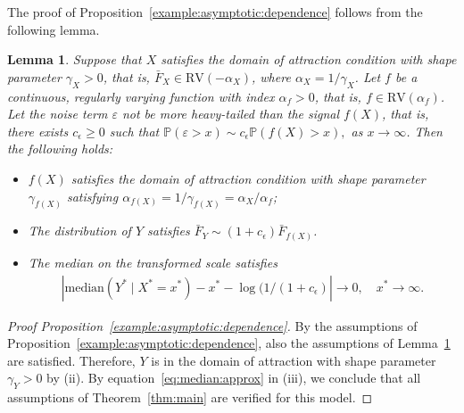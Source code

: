 \documentclass{statsoc}
\newtheorem{lemma}{Lemma}
\theoremstyle{break}
\renewcommand{\P}{\mathbb P}
\def\M{\text{median}}
\begin{document}
The proof of Proposition~\ref{example:asymptotic:dependence} follows from the following lemma.

\begin{lemma}\label{lem:regular:variation:fx}
	Suppose that $X$ satisfies the domain of attraction condition with shape parameter $\gamma_X > 0$, that is, $\bar F_X \in \text{RV}(-\alpha_X)$, where $\alpha_X  = 1 / \gamma_X$. Let $f$ be a continuous, regularly varying function with index $\alpha_f > 0$, that is, $f \in \text{RV}(\alpha_f)$.
	Let the noise term $\varepsilon$ not be more heavy-tailed than the signal $f(X)$, that is, there exists $c_\epsilon \geq 0$ such that  $\P(\varepsilon > x) \sim c_\epsilon \P(f(X)>x),$ as $x\to\infty$. Then the following holds:
	\begin{itemize}
		\item[(i)] $f(X)$ satisfies the domain of attraction condition with shape parameter $\gamma_{f(X)}$ satisfying $\alpha_{f(X)} = 1/\gamma_{f(X)} = \alpha_X/\alpha_f $;
		\item[(ii)] The distribution of $Y$ satisfies $\bar F_Y \sim (1+c_\epsilon)\bar F_{f(X)}$.
		\item[(iii)] The median on the transformed scale satisfies
		\begin{align}\label{eq:median:approx}
			| \M( Y^* \mid X^* = x^*) - x^* - \log(1/(1+c_\epsilon) | \to 0, \quad x^*\to \infty.
		\end{align}
	\end{itemize}
\end{lemma}

\begin{proof}[Proof Proposition~\ref{example:asymptotic:dependence}]
	By the assumptions of Proposition~\ref{example:asymptotic:dependence}, also the assumptions of Lemma~\ref{lem:regular:variation:fx} are satisfied. Therefore, $Y$ is in the domain of attraction with shape parameter $\gamma_Y >0 $ by (ii).
	By equation~\eqref{eq:median:approx} in (iii), we conclude that all assumptions of Theorem~\ref{thm:main} are verified for this model. 
\end{proof}
\end{document}
